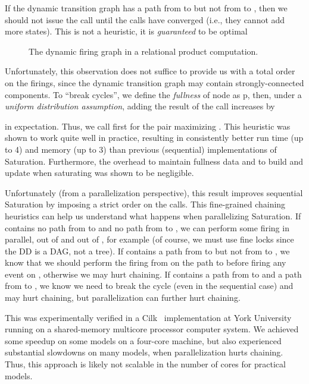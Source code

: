 \documentclass[copyright,creativecommons]{eptcs}
\newcommand{\CENTERPSSCALE}[2]{\begin{center}\mbox{\epsfig{file=#1.eps, scale=#2}}\end{center}}
\begin{document}
If the dynamic transition graph has a path from  to  but not
from  to , then we should not issue the
call  until
the calls  have converged
(i.e., they cannot add more states).
This is not a heuristic, it is \emph{guaranteed} to be optimal


\begin{figure}
\begin{center}
\CENTERPSSCALE{pardis-dynamic-graph}{0.74}
\end{center}
\caption{The dynamic firing graph in a relational product computation.}
\label{FIG:pardis-dynamic-graph}
\end{figure}

Unfortunately, this observation does not suffice to provide us with a total
order on the firings, since the dynamic transition graph may contain
strongly-connected components.
To ``break cycles'', we define the \emph{fullness} of node  as
p, then,
under a \emph{uniform distribution assumption},
adding the result of the call 
increases  by

in expectation.
Thus, we call first  for the pair 
maximizing .
This heuristic was shown to work quite well in practice, resulting in
consistently better run time (up to 4) and memory (up to 3)
than previous (sequential) implementations of Saturation.
Furthermore, the overhead to maintain fullness data and
to build and update  when saturating  was shown to be negligible.

Unfortunately (from a parallelization perspective), this result
improves sequential Saturation by imposing a strict order on the
 calls.
This fine-grained chaining heuristics
can help us understand what happens when parallelizing Saturation.
If  contains no path from  to  and no path from  to ,
we can perform some firing in parallel, out of  and out of , for example
(of course, we must use fine locks since the DD is a DAG, not a tree).
If  contains a path from  to  but not from  to ,
we know that we should perform the firing from  on the path to  before
firing any event on , otherwise we may hurt chaining.
If  contains a path from  to  and a path from  to ,
we know we need to break the cycle (even in the sequential case)
and may hurt chaining, but parallelization can further hurt chaining.

This was experimentally verified in a Cilk~\cite{Blumofe1996Cilk}
implementation at York University~\cite{2007CAV-Cilk} running on a
shared-memory multicore processor computer system.
We achieved some speedup on some models on a four-core machine, but also
experienced substantial slowdowns on many models,
when parallelization hurts chaining.
Thus, this approach is likely not scalable in the number of cores
for practical models.
\end{document}
